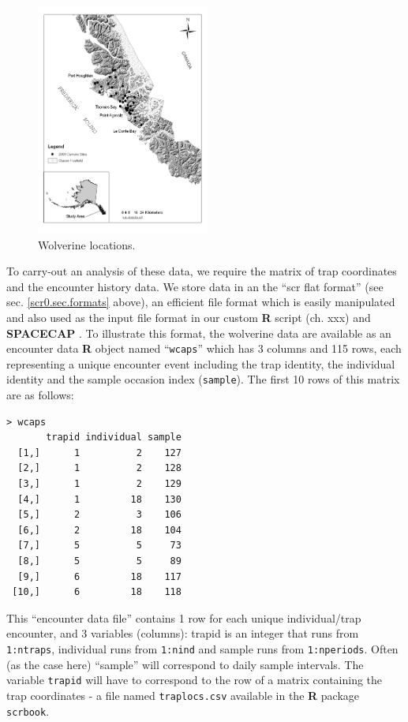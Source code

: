 \begin{figure}
\begin{center}
\includegraphics[height=3in]{figs/wolverinelocs}
\end{center}
\caption{Wolverine locations.}
\label{scr0.fig.wolverinelocs}
\end{figure}

To carry-out an analysis of these data, we require the matrix of trap
coordinates and the encounter history data.  We store data in an
the
``scr flat format'' (see sec.
\ref{scr0.sec.formats}
 above), an
efficient file format which is easily manipulated and also used as the
input file format in our custom {\bf R} script (ch. xxx) and {\bf
  SPACECAP}
 \citep{gopalaswamy_etal:2012}.
 To illustrate this
format, the wolverine data are available as an encounter data {\bf R} object
named ``\mbox{\tt wcaps}'' which has 3 columns and 115 rows, each representing a
unique encounter event including the trap identity, the individual
identity and the sample occasion index (\mbox{\tt sample}).  
The first 10 rows of this matrix are as
follows:
\begin{verbatim}
> wcaps
       trapid individual sample
  [1,]      1          2    127
  [2,]      1          2    128
  [3,]      1          2    129
  [4,]      1         18    130
  [5,]      2          3    106
  [6,]      2         18    104
  [7,]      5          5     73
  [8,]      5          5     89
  [9,]      6         18    117
 [10,]      6         18    118
\end{verbatim}

This ``encounter data file'' contains 1 row for each unique
individual/trap encounter, and 3 variables (columns): trapid is an
integer that runs from \mbox{\tt 1:ntraps}, individual runs from
\mbox{\tt 1:nind} and
sample runs from \mbox{\tt 1:nperiods}. Often (as the case here) ``sample'' will
correspond to daily sample intervals. The variable \mbox{\tt trapid} will have to
correspond to the row of a matrix containing the trap coordinates - a
file named \mbox{\tt traplocs.csv} available in the {\bf R} package
\mbox{\tt scrbook}.

